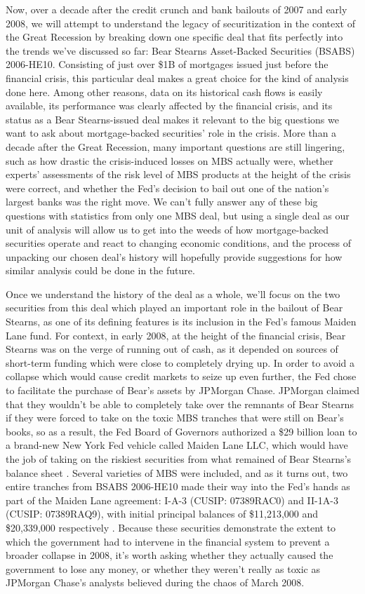 \documentclass[12pt]{article}
\begin{document}
Now, over a decade after the credit crunch and bank bailouts of 2007 and early 2008, we will attempt to understand the legacy of securitization in the context of the Great Recession by breaking down one specific deal that fits perfectly into the trends we’ve discussed so far: Bear Stearns Asset-Backed Securities (BSABS) 2006-HE10. Consisting of just over \$1B of mortgages issued just before the financial crisis, this particular deal makes a great choice for the kind of analysis done here. Among other reasons, data on its historical cash flows is easily available, its performance was clearly affected by the financial crisis, and its status as a Bear Stearns-issued deal makes it relevant to the big questions we want to ask about mortgage-backed securities’ role in the crisis. More than a decade after the Great Recession, many important questions are still lingering, such as how drastic the crisis-induced losses on MBS actually were, whether experts’ assessments of the risk level of MBS products at the height of the crisis were correct, and whether the Fed’s decision to bail out one of the nation’s largest banks was the right move. We can’t fully answer any of these big questions with statistics from only one MBS deal, but using a single deal as our unit of analysis will allow us to get into the weeds of how mortgage-backed securities operate and react to changing economic conditions, and the process of unpacking our chosen deal’s history will hopefully provide suggestions for how similar analysis could be done in the future.

Once we understand the history of the deal as a whole, we’ll focus on the two securities from this deal which played an important role in the bailout of Bear Stearns, as one of its defining features is its inclusion in the Fed’s famous Maiden Lane fund. For context, in early 2008, at the height of the financial crisis, Bear Stearns was on the verge of running out of cash, as it depended on sources of short-term funding which were close to completely drying up. In order to avoid a collapse which would cause credit markets to seize up even further, the Fed chose to facilitate the purchase of Bear’s assets by JPMorgan Chase. JPMorgan claimed that they wouldn’t be able to completely take over the remnants of Bear Stearns if they were forced to take on the toxic MBS tranches that were still on Bear’s books, so as a result, the Fed Board of Governors authorized a \$29 billion loan to a brand-new New York Fed vehicle called Maiden Lane LLC, which would have the job of taking on the riskiest securities from what remained of Bear Stearns’s balance sheet \parencite{fcic09}. Several varieties of MBS were included, and as it turns out, two entire tranches from BSABS 2006-HE10 made their way into the Fed’s hands as part of the Maiden Lane agreement: I-A-3 (CUSIP: 07389RAC0) and II-1A-3 (CUSIP: 07389RAQ9), with initial principal balances of \$11,213,000 and \$20,339,000 respectively \parencite{fcic09}. Because these securities demonstrate the extent to which the government had to intervene in the financial system to prevent a broader collapse in 2008, it’s worth asking whether they actually caused the government to lose any money, or whether they weren’t really as toxic as JPMorgan Chase’s analysts believed during the chaos of March 2008.
\end{document}
